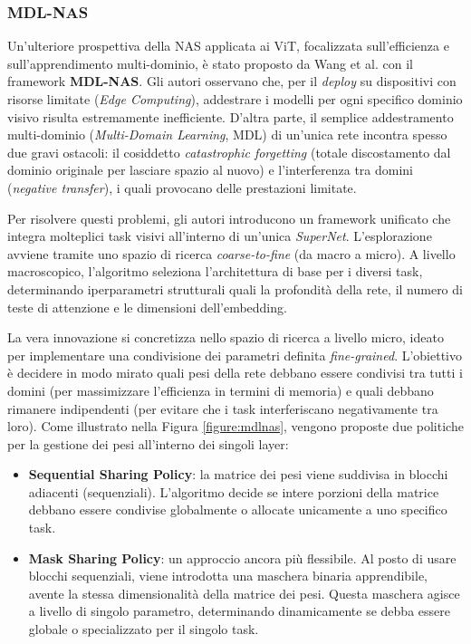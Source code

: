 \subsubsection{MDL-NAS}
Un'ulteriore prospettiva della NAS applicata ai ViT, focalizzata
sull'efficienza e sull'apprendimento multi-dominio, è stato proposto da Wang et
al. \cite{wang2023mdlnas} con il framework \textbf{MDL-NAS}. Gli autori
osservano che, per il \textit{deploy} su dispositivi con risorse limitate
(\textit{Edge Computing}), addestrare i modelli per ogni specifico dominio
visivo risulta estremamente inefficiente. D'altra parte, il semplice
addestramento multi-dominio (\textit{Multi-Domain Learning}, MDL) di un'unica
rete incontra spesso due gravi ostacoli: il cosiddetto \textit{catastrophic
    forgetting} (totale discostamento dal dominio originale per lasciare spazio al
nuovo) e l'interferenza tra domini (\textit{negative transfer}), i quali
provocano delle prestazioni limitate. \par
Per risolvere questi problemi, gli autori introducono un framework unificato
che integra molteplici task visivi all'interno di un'unica \textit{SuperNet}.
L'esplorazione avviene tramite uno spazio di ricerca \textit{coarse-to-fine}
(da macro a micro). A livello macroscopico, l'algoritmo seleziona
l'architettura di base per i diversi task, determinando iperparametri
strutturali quali la profondità della rete, il numero di teste di attenzione e
le dimensioni dell'embedding. \par
La vera innovazione si concretizza nello spazio di ricerca a livello micro,
ideato per implementare una condivisione dei parametri definita
\textit{fine-grained}. L'obiettivo è decidere in modo mirato quali pesi della
rete debbano essere condivisi tra tutti i domini (per massimizzare l'efficienza
in termini di memoria) e quali debbano rimanere indipendenti (per evitare che i
task interferiscano negativamente tra loro). Come illustrato nella Figura
\ref{figure:mdlnas}, vengono proposte due politiche per la gestione dei pesi
all'interno dei singoli layer:
\begin{itemize}
    \item \textbf{Sequential Sharing Policy}: la matrice dei pesi viene suddivisa in blocchi adiacenti (sequenziali). L'algoritmo decide se intere porzioni della matrice debbano essere condivise globalmente o allocate unicamente a uno specifico task.
    \item \textbf{Mask Sharing Policy}: un approccio ancora più flessibile. Al posto di usare blocchi sequenziali, viene introdotta una maschera binaria apprendibile, avente la stessa dimensionalità della matrice dei pesi. Questa maschera agisce a livello di singolo parametro, determinando dinamicamente se debba essere globale o specializzato per il singolo task.
\end{itemize}
